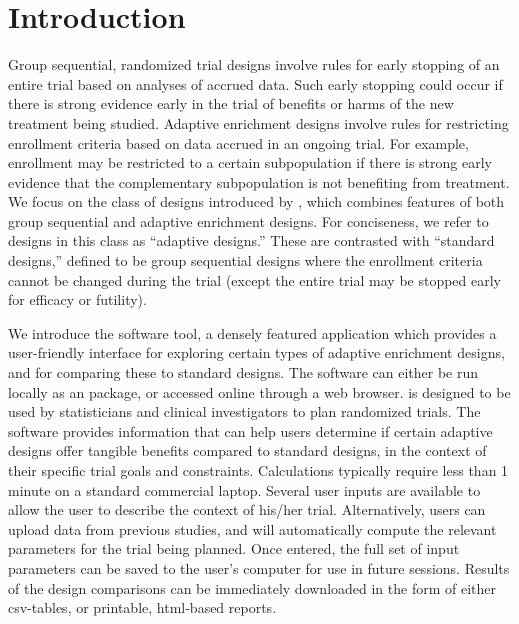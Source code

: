 \documentclass[article]{jss}
\begin{document}
\section*{Introduction} \label{sec:intro}
Group sequential, randomized trial designs involve rules for early stopping of an entire trial based on analyses of accrued data. Such early stopping could occur if there is strong evidence early in the trial of benefits or harms of the new treatment being studied. Adaptive enrichment designs involve rules for restricting enrollment criteria based on data accrued in an ongoing trial. For example, enrollment may be restricted to a certain subpopulation if there is strong early evidence that the complementary subpopulation is not benefiting from treatment.
We focus on the  class of designs introduced by \cite{Rosenblum2013AdaptMISTIE}, which combines features of both group sequential and adaptive enrichment designs. For conciseness, we refer to designs in this class as  ``adaptive designs.''
These are contrasted with ``standard designs,'' 
defined to  be group sequential designs where the enrollment criteria cannot be changed during the trial (except the entire trial may be stopped early for efficacy or futility). 

We introduce the  software tool, a densely featured  application which provides a user-friendly interface for exploring certain types of adaptive enrichment designs, and for comparing these to standard designs. %
The software can either be run locally as an  package, or accessed online through a web browser. 
 is designed to be used by statisticians and clinical investigators to plan randomized trials. The software provides information that can help users determine if certain adaptive designs offer tangible benefits compared to standard designs, in the context of their specific trial goals and constraints. Calculations typically require less than 1 minute on a standard commercial laptop. Several user inputs are available to allow the user to describe the context of his/her trial. Alternatively, users can upload data from previous studies, and  will automatically compute the relevant parameters for the trial being planned. Once entered, the full set of input parameters can be saved to the user's computer for use in future sessions. Results of the design comparisons can be immediately downloaded in the form of either csv-tables, or printable, html-based reports.
\end{document}

